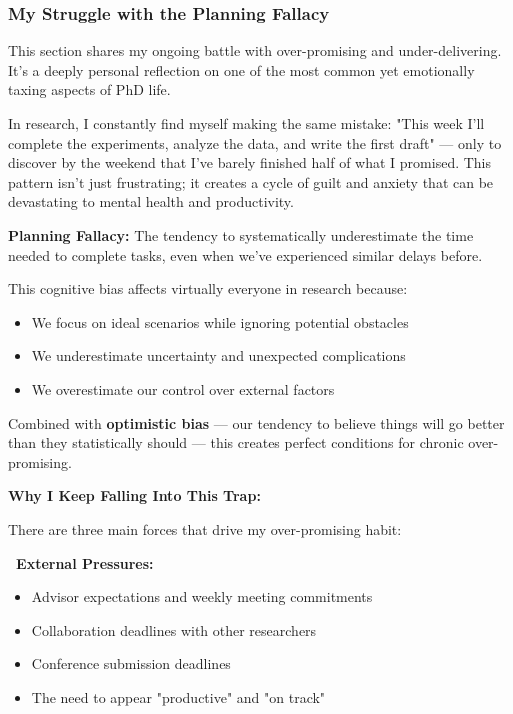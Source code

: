 \documentclass[11pt,a4paper]{article}
\begin{document}
\subsubsection{My Struggle with the Planning Fallacy}

\begin{tcolorbox}[colback=blue!5,colframe=blue!40,title={\faThumbtack~Author's Note}]
This section shares my ongoing battle with over-promising and under-delivering. It's a deeply personal reflection on one of the most common yet emotionally taxing aspects of PhD life.
\end{tcolorbox}

In research, I constantly find myself making the same mistake: "This week I'll complete the experiments, analyze the data, and write the first draft" — only to discover by the weekend that I've barely finished half of what I promised. This pattern isn't just frustrating; it creates a cycle of guilt and anxiety that can be devastating to mental health and productivity.

\begin{tcolorbox}[colback=yellow!5,colframe=orange!60,title={\faLightbulb~Why This Happens: The Planning Fallacy}]
\textbf{Planning Fallacy:} The tendency to systematically underestimate the time needed to complete tasks, even when we've experienced similar delays before.

This cognitive bias affects virtually everyone in research because:
\begin{itemize}[leftmargin=1.5em]
    \item We focus on ideal scenarios while ignoring potential obstacles
    \item We underestimate uncertainty and unexpected complications
    \item We overestimate our control over external factors
\end{itemize}

Combined with \textbf{optimistic bias} — our tendency to believe things will go better than they statistically should — this creates perfect conditions for chronic over-promising.
\end{tcolorbox}

\textbf{Why I Keep Falling Into This Trap:}

There are three main forces that drive my over-promising habit:

\vspace{0.5em}
\textbf{\faUsers~External Pressures:} 
\begin{itemize}[leftmargin=1.5em]
    \item Advisor expectations and weekly meeting commitments
    \item Collaboration deadlines with other researchers
    \item Conference submission deadlines
    \item The need to appear "productive" and "on track"
\end{itemize}
\end{document}
